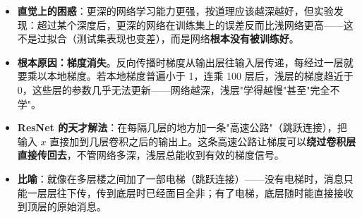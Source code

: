 \documentclass[a4paper,11pt]{ctexart}
\begin{document}
\begin{beginnerbox}
    \begin{itemize}
        \item \textbf{直觉上的困惑}：更深的网络学习能力更强，按道理应该越深越好，但实验发现：超过某个深度后，更深的网络在训练集上的误差反而比浅网络更高——这不是过拟合（测试集表现也变差），而是网络\textbf{根本没有被训练好}。
        \item \textbf{根本原因：梯度消失}。反向传播时梯度从输出层往输入层传递，每经过一层就要乘以本地梯度。若本地梯度普遍小于 1，连乘 100 层后，浅层的梯度趋近于 0，这些层的参数几乎无法更新——网络越深，浅层"学得越慢"甚至"完全不学"。
        \item \textbf{ResNet 的天才解法}：在每隔几层的地方加一条"高速公路"（跳跃连接），把输入 $x$ 直接加到几层卷积之后的输出上。这条高速公路让梯度可以\textbf{绕过卷积层直接传回去}，不管网络多深，浅层总能收到有效的梯度信号。
        \item \textbf{比喻}：就像在多层楼之间加了一部电梯（跳跃连接）——没有电梯时，消息只能一层层往下传，传到底层时已经面目全非；有了电梯，底层随时能直接接收到顶层的原始消息。
    \end{itemize}
\end{beginnerbox}
\end{document}
